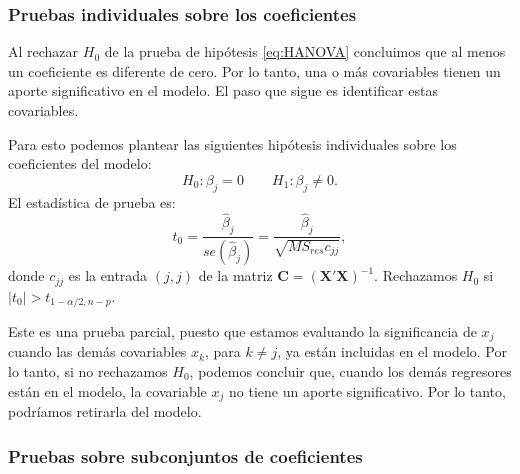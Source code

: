 \documentclass[
]{article}
\begin{document}
\hypertarget{pruebas-individuales-sobre-los-coeficientes}{%
\subsubsection{Pruebas individuales sobre los coeficientes}\label{pruebas-individuales-sobre-los-coeficientes}}

Al rechazar \(H_{0}\) de la prueba de hipótesis \eqref{eq:HANOVA} concluimos que al menos un coeficiente es diferente de cero. Por lo tanto, una o más covariables tienen un aporte significativo en el modelo. El paso que sigue es identificar estas covariables.

Para esto podemos plantear las siguientes hipótesis individuales sobre los coeficientes del modelo:
\[
H_{0}: \beta_{j} = 0 \qquad H_{1}: \beta_{j} \neq 0.
\]
El estadística de prueba es:
\[
t_{0} = \frac{\widehat{\beta}_{j}}{se(\widehat{\beta}_{j})} = \frac{\widehat{\beta}_{j}}{\sqrt{MS_{res}c_{jj}}},
\]
donde \(c_{jj}\) es la entrada \((j,j)\) de la matriz \(\boldsymbol C= (\boldsymbol X'\boldsymbol X)^{-1}\). Rechazamos \(H_{0}\) si \(|t_{0}| > t_{1-\alpha/2,n-p}\).

Este es una prueba parcial, puesto que estamos evaluando la significancia de \(x_{j}\) cuando las demás covariables \(x_{k}\), para \(k\neq j\), ya están incluidas en el modelo. Por lo tanto, si no rechazamos \(H_{0}\), podemos concluir que, cuando los demás regresores están en el modelo, la covariable \(x_{j}\) no tiene un aporte significativo. Por lo tanto, podríamos retirarla del modelo.

\hypertarget{pruebas-sobre-subconjuntos-de-coeficientes}{%
\subsubsection{Pruebas sobre subconjuntos de coeficientes}\label{pruebas-sobre-subconjuntos-de-coeficientes}}
\end{document}
